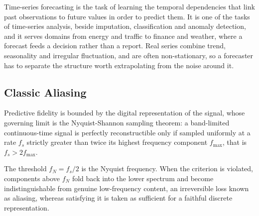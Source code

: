 Time-series forecasting is the task of learning the temporal dependencies that link past observations to future values in order to predict them. It is one of the tasks of time-series analysis, beside imputation, classification and anomaly detection, and it serves domains from energy and traffic to finance and weather, where a forecast feeds a decision rather than a report. Real series combine trend, seasonality and irregular fluctuation, and are often non-stationary, so a forecaster has to separate the structure worth extrapolating from the noise around it\autocite{wangDeepTimeSeries2026}.

\subsection*{Classic Aliasing}
Predictive fidelity is bounded by the digital representation of the signal, whose governing limit is the Nyquist-Shannon sampling theorem\autocite{shannonCommunicationPresenceNoise1949,oppenheimDiscreteTimeSignalProcessing2010}: a band-limited continuous-time signal is perfectly reconstructible only if sampled uniformly at a rate $f_s$ strictly greater than twice its highest frequency component $f_{\max}$, that is $f_s>2f_{\max}$.

The threshold $f_N = f_s/2$ is the Nyquist frequency. When the criterion is violated, components above $f_N$ fold back into the lower spectrum and become indistinguishable from genuine low-frequency content, an irreversible loss known as aliasing, whereas satisfying it is taken as sufficient for a faithful discrete representation.

